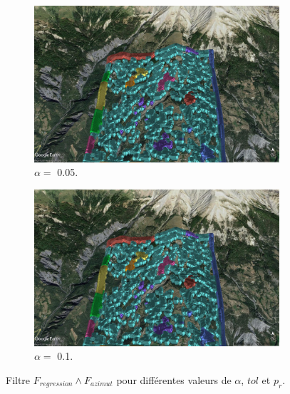 \documentclass[11pt, openany]{report}
\begin{document}
\begin{figure}[!h]
  \begin{subfigure}[b]{0.5\textwidth}
    \includegraphics[width=\textwidth]{test_reg_azimut_0.jpg}
    \caption{$\alpha = $ 0.05.}
    \label{fig:f1}
  \end{subfigure}
  \hfill
  \begin{subfigure}[b]{0.5\textwidth}
    \includegraphics[width=\textwidth]{test_reg_azimut_1.jpg}
    \caption{$\alpha = $ 0.1.}
    \label{fig:f2}
  \end{subfigure}
  \caption{Filtre $F_{regression} \wedge F_{azimut}$ pour différentes valeurs de $\alpha$, $tol$ et $p_r$.}
\end{figure}
\end{document}
